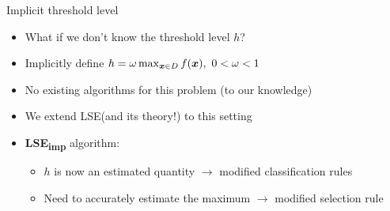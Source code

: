 \documentclass[10pt,mathserif]{beamer}
\newcommand{\acl}{\textsf{LSE}\xspace}
\newcommand{\iacl}{\textsf{LSE\textsubscript{imp}}\xspace}
\begin{document}
\begin{frame}
\begin{center}
\large Implicit threshold level
\end{center}
\begin{itemize}
\item<1-> What if we don't know the threshold level $h$?
\vspace{1em}
\item<2-> Implicitly define $h = \omega \max_{\bm{x}\in D} f(\bm{x}),\ 0 < \omega < 1$
\vspace{1em}
\item<3-> No existing algorithms for this problem (to our knowledge)
\vspace{1em}
\item<4-> We extend \acl (and its theory!) to this setting
\vspace{1em}
\item<5->\textbf{\iacl} algorithm:
\begin{itemize}
\item<6-> $h$ is now an estimated quantity $\rightarrow$ modified classification rules
\item<7-> Need to accurately estimate the maximum $\rightarrow$ modified selection rule
\end{itemize}
\end{itemize}
\begin{center}
\end{center}
\end{frame}
\end{document}
